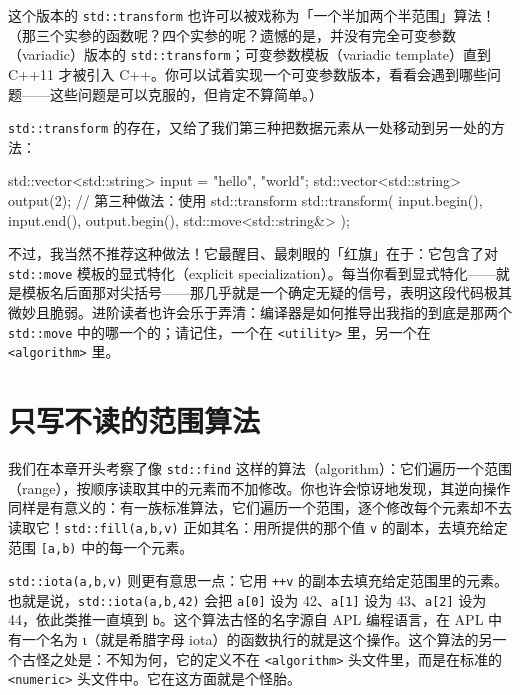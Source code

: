 这个版本的 \texttt{std::\allowbreak{}transform} 也许可以被戏称为「一个半加两个半范围」算法！（那三个实参的函数呢？四个实参的呢？遗憾的是，并没有完全可变参数（variadic）版本的 \texttt{std::\allowbreak{}transform}；可变参数模板（variadic template）直到 C++11 才被引入 C++。你可以试着实现一个可变参数版本，看看会遇到哪些问题——这些问题是可以克服的，但肯定不算简单。）

\texttt{std::\allowbreak{}transform} 的存在，又给了我们第三种把数据元素从一处移动到另一处的方法：

\begin{codebox}[cpp]
    std::vector<std::string> input = {"hello", "world"};
    std::vector<std::string> output(2);
    // 第三种做法：使用 std::transform
    std::transform(
      input.begin(),
      input.end(),
      output.begin(),
      std::move<std::string&>
    );
\end{codebox}

不过，我当然不推荐这种做法！它最醒目、最刺眼的「红旗」在于：它包含了对 \texttt{std::\allowbreak{}move} 模板的显式特化（explicit specialization）。每当你看到显式特化——就是模板名后面那对尖括号——那几乎就是一个确定无疑的信号，表明这段代码极其微妙且脆弱。进阶读者也许会乐于弄清：编译器是如何推导出我指的到底是那两个 \texttt{std::\allowbreak{}move} 中的哪一个的；请记住，一个在 \texttt{<utility>\allowbreak{}} 里，另一个在 \texttt{<algorithm>\allowbreak{}} 里。

\section{只写不读的范围算法}

我们在本章开头考察了像 \texttt{std::\allowbreak{}find} 这样的算法（algorithm）：它们遍历一个范围（range），按顺序读取其中的元素而不加修改。你也许会惊讶地发现，其逆向操作同样是有意义的：有一族标准算法，它们遍历一个范围，逐个修改每个元素却不去读取它！\texttt{std::\allowbreak{}fill(\allowbreak{}a,\allowbreak{}b,\allowbreak{}v)\allowbreak{}} 正如其名：用所提供的那个值 \texttt{v} 的副本，去填充给定范围 \texttt{[a,\allowbreak{}b)\allowbreak{}} 中的每一个元素。

\texttt{std::\allowbreak{}iota(\allowbreak{}a,\allowbreak{}b,\allowbreak{}v)\allowbreak{}} 则更有意思一点：它用 \texttt{++v} 的副本去填充给定范围里的元素。也就是说，\texttt{std::\allowbreak{}iota(\allowbreak{}a,\allowbreak{}b,\allowbreak{}42)\allowbreak{}} 会把 \texttt{a[0]} 设为 42、\texttt{a[1]} 设为 43、\texttt{a[2]} 设为 44，依此类推一直填到 \texttt{b}。这个算法古怪的名字源自 APL 编程语言，在 APL 中有一个名为 ι（就是希腊字母 iota）的函数执行的就是这个操作。这个算法的另一个古怪之处是：不知为何，它的定义不在 \texttt{<algorithm>\allowbreak{}} 头文件里，而是在标准的 \texttt{<numeric>\allowbreak{}} 头文件中。它在这方面就是个怪胎。

